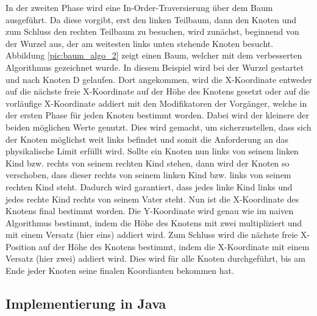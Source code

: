 In der zweiten Phase wird eine In-Order-Traversierung über dem Baum ausgeführt. Da diese vorgibt, erst den linken Teilbaum, dann den Knoten
und zum Schluss den rechten Teilbaum zu besuchen, wird zunächst, beginnend von der Wurzel aus, der am weitesten links unten stehende Knoten 
besucht. Abbildung \ref{pic:baum_algo_2} zeigt einen Baum, welcher mit dem verbesserten Algorithmus gezeichnet wurde. In diesem Beispiel 
wird bei der Wurzel gestartet und nach Knoten D gelaufen. Dort angekommen, wird die X-Koordinate entweder auf die nächste freie 
X-Koordinate auf der Höhe des Knotens gesetzt oder auf die vorläufige X-Koordinate addiert mit den Modifikatoren der Vorgänger, welche in 
der ersten Phase für jeden Knoten bestimmt worden. Dabei wird der kleinere der beiden möglichen Werte genutzt. 
Dies wird gemacht, um sicherzustellen, dass sich der Knoten möglichst weit links befindet und somit die Anforderung an das 
physikalische Limit erfüllt wird.
Sollte ein Knoten nun links von seinem linken Kind bzw. rechts von seinem rechten Kind stehen, dann wird der Knoten so verschoben, dass dieser
rechts von seinem linken Kind bzw. links von seinem rechten Kind steht. Dadurch wird garantiert, dass jedes linke Kind links
und jedes rechte Kind rechts von seinem Vater steht.
Nun ist die X-Koordinate des Knotens final bestimmt worden. Die Y-Koordinate wird genau wie im naiven Algorithmus bestimmt, 
indem die Höhe des Knotens mit zwei multipliziert und mit einem Versatz (hier eins) addiert wird. Zum Schluss wird die nächste 
freie X-Position auf der Höhe des Knotens bestimmt, indem die X-Koordinate mit einem Versatz (hier zwei) addiert wird. Dies wird für alle
Knoten durchgeführt, bis am Ende jeder Knoten seine finalen Koordianten bekommen hat.


\subsection{Implementierung in Java}

